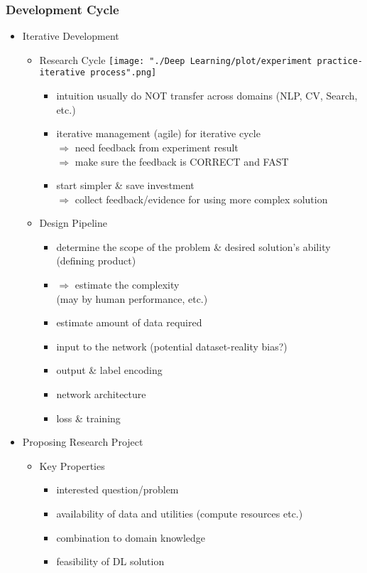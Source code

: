 \subsubsection{Development Cycle}
\begin{itemize}
\item Iterative Development
	\begin{itemize}
	\item Research Cycle
		\texttt{[image: "./Deep Learning/plot/experiment practice-iterative process".png]}
		\begin{itemize}
		\item intuition usually do NOT transfer across domains (NLP, CV, Search, etc.)
		\item iterative management (agile) for iterative cycle \\
		$\Rightarrow$ need feedback from experiment result \\
		$\Rightarrow$ make sure the feedback is CORRECT and FAST
		\item start simpler \& save investment \\
		$\Rightarrow$ collect feedback/evidence for using more complex solution
		\end{itemize}
	\item Design Pipeline
		\begin{itemize}
		\item determine the scope of the problem \& desired solution's ability \\
		(defining product)
		\item $\Rightarrow$ estimate the complexity \\
		(may by human performance, etc.)
		\item estimate amount of data required
		\item input to the network (potential dataset-reality bias?)
		\item output \& label encoding
		\item network architecture
		\item loss \& training
		\end{itemize}
	\end{itemize}
\item Proposing Research Project
	\begin{itemize}
	\item Key Properties
		\begin{itemize}
		\item interested question/problem
		\item availability of data and utilities (compute resources etc.)
		\item combination to domain knowledge
		\item feasibility of DL solution
		\end{itemize}
	\end{itemize}
\end{itemize}

